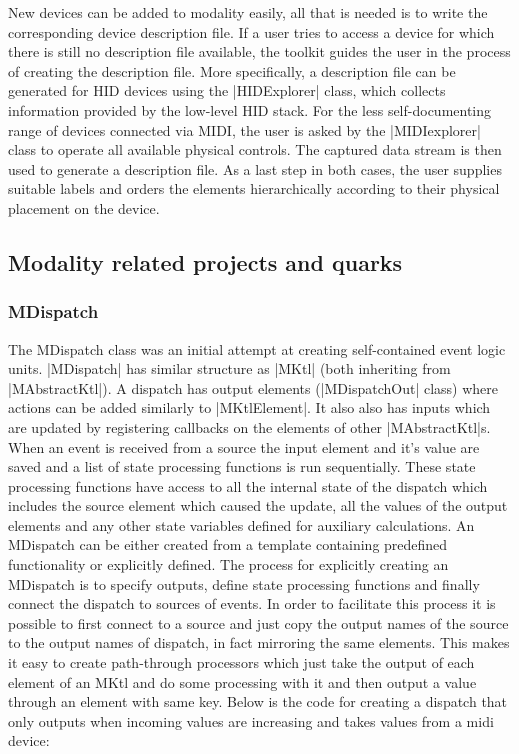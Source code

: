 \documentclass{article}
\begin{document}
New devices can be added to modality easily, all that is needed is to write the corresponding device description file. 
If a user tries to access a device for which there is still no description file available, the toolkit guides the user in the process of creating the description file. 
More specifically, a description file can be generated for HID devices using the |HIDExplorer| class, which collects information provided by the low-level HID stack. 
For the less self-documenting range of devices connected via MIDI, the user is asked by the |MIDIexplorer| class to operate all available physical controls. 
The captured data stream is then used to generate a description file.
As a last step in both cases, the user supplies suitable labels and orders the elements hierarchically according to their physical placement on the device.






\subsection{Modality related projects and quarks}
\label{sub:modality_related_projects_and_quarks}

	
\subsubsection{MDispatch}	

The MDispatch class was an initial attempt at creating self-contained event logic units. |MDispatch| has similar structure as |MKtl| (both inheriting from |MAbstractKtl|). A dispatch has output elements (|MDispatchOut| class) where actions can be added similarly to |MKtlElement|. It also also has inputs which are updated by registering callbacks on the elements of other |MAbstractKtl|s. When an event is received from a source the input element and it's value are saved and a list of state processing functions is run sequentially. These state processing functions have access to all the internal state of the dispatch which includes the source element which caused the update, all the values of the output elements and any other state variables defined for auxiliary calculations. An MDispatch can be either created from a template containing predefined functionality or explicitly defined. The process for explicitly creating an MDispatch is to specify outputs, define state processing functions and finally connect the dispatch to sources of events. In order to facilitate this process it is possible to first connect to a source and just copy the output names of the source to the output names of dispatch, in fact mirroring the same elements. This makes it easy to create path-through processors which just take the output of each element of an MKtl and do some processing with it and then output a value through an element with same key. Below is the code for creating a dispatch that only outputs when incoming values are increasing and takes values from a midi device:
\end{document}

